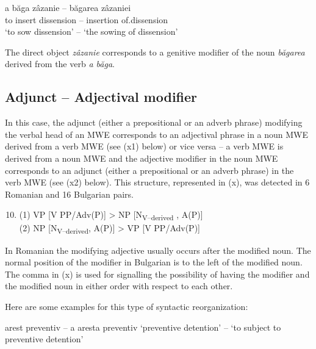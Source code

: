 \documentclass[output=paper]{langsci/langscibook}
\begin{document}
\begin{exe}
\ex \label{ex:8:45}
\settowidth{}
\gll a băga zâzanie – băgarea zâzaniei \\
to insert dissension – insertion {of.dissension} \\
\glt ‘to sow dissension’ – ‘the sowing of dissension’
\end{exe}


The direct object \textit{zâzanie} corresponds to a genitive modifier of the
noun \textit{băgarea} derived from the verb \textit{a băga}.



\subsection{Adjunct –
Adjectival modifier}
\label{section64}

In this case, the adjunct (either a prepositional or an adverb phrase)
modifying the verbal head of an MWE corresponds to an adjectival phrase
in a noun MWE derived from a verb MWE (see (x1) below) or vice versa –
a verb MWE is derived from a noun MWE and the adjective modifier in the
noun MWE corresponds to an adjunct (either a prepositional or an adverb
phrase) in the verb MWE (see (x2) below). This structure, represented
in (x), was detected in 6 Romanian and 16 Bulgarian pairs. 



\renewcommand{\theenumi}{(\roman{enumi})}%
\begin{enumerate}
 \setcounter{enumi}{9}
\item (1) VP [V PP/Adv(P)] > NP [N\textsubscript{V–derived }, A(P)] \\
(2) NP [N\textsubscript{V–derived}, A(P)] > VP [V PP/Adv(P)]
\end{enumerate}


In Romanian the modifying adjective usually occurs after the modified
noun. The normal position of the modifier in Bulgarian is to the left
of the modified noun. The comma in (x) is used for signalling the
possibility of having the modifier and the modified noun in either
order with respect to each other.



Here are some examples for this type of syntactic reorganization: 



\begin{exe}
\ex \label{ex:8:46}
\settowidth{}
arest preventiv – a aresta preventiv 
‘preventive detention’ – ‘to subject to preventive detention’
\end{exe}
\end{document}

